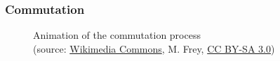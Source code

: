 \begin{frame}
	\frametitle{Commutation}
    \begin{figure}
		\centering
		\caption{Animation of the commutation process \\(source: \href{https://commons.wikimedia.org/wiki/File:Animation_einer_Gleichstrommaschine_(Variante-Langsam).gif}{Wikimedia Commons}, M. Frey, \href{https://creativecommons.org/licenses/by-sa/3.0/deed.en}{CC BY-SA 3.0})}
	\end{figure}
\end{frame}

